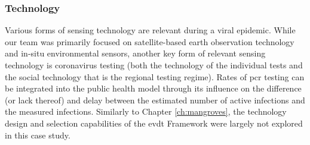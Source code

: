 %
%
%
%
%




\subsubsection{Technology}

Various forms of sensing technology are relevant during a viral epidemic. While our team was primarily focused on satellite-based earth observation technology and in-situ environmental sensors, another key form of relevant sensing technology is coronavirus testing (both the technology of the individual tests and the social technology that is the regional testing regime). Rates of \ac{pcr} testing can be integrated into the public health model through its influence on the difference (or lack thereof) and delay between the estimated number of active infections and the measured infections. Similarly to Chapter \ref{ch:mangroves}, the technology design and selection capabilities of the \ac{evdt} Framework were largely not explored in this case study. 

